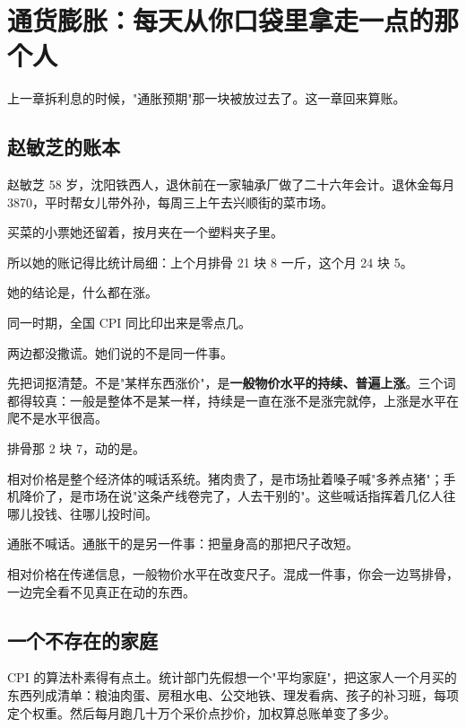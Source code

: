 \chapter{通货膨胀：每天从你口袋里拿走一点的那个人}

\begin{ledetext}
上一章拆利息的时候，"通胀预期"那一块被放过去了。这一章回来算账。
\end{ledetext}

\section{赵敏芝的账本}

赵敏芝 58 岁，沈阳铁西人，退休前在一家轴承厂做了二十六年会计。退休金每月 3870，平时帮女儿带外孙，每周三上午去兴顺街的菜市场。

买菜的小票她还留着，按月夹在一个塑料夹子里。

所以她的账记得比统计局细：上个月排骨 21 块 8 一斤，这个月 24 块 5。

她的结论是，什么都在涨。

同一时期，全国 CPI 同比印出来是零点几。

两边都没撒谎。她们说的不是同一件事。

先把词抠清楚。不是"某样东西涨价"，是\textbf{一般物价水平的持续、普遍上涨}。三个词都得较真：一般是整体不是某一样，持续是一直在涨不是涨完就停，上涨是水平在爬不是水平很高。

排骨那 2 块 7，动的是。

相对价格是整个经济体的喊话系统。猪肉贵了，是市场扯着嗓子喊"多养点猪"；手机降价了，是市场在说"这条产线卷完了，人去干别的"。这些喊话指挥着几亿人往哪儿投钱、往哪儿投时间。

通胀不喊话。通胀干的是另一件事：把量身高的那把尺子改短。

\begin{pullquote}{}
相对价格在传递信息，一般物价水平在改变尺子。混成一件事，你会一边骂排骨，一边完全看不见真正在动的东西。
\end{pullquote}

\section{一个不存在的家庭}

CPI 的算法朴素得有点土。统计部门先假想一个"平均家庭"，把这家人一个月买的东西列成清单：粮油肉蛋、房租水电、公交地铁、理发看病、孩子的补习班，每项定个权重。然后每月跑几十万个采价点抄价，加权算总账单变了多少。

